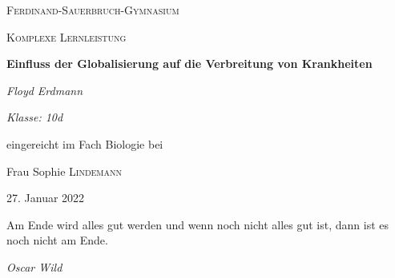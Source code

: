 \documentclass[12pt]{article}
\begin{document}
\setlength{\baselineskip}{5mm}
\onehalfspacing

\begin{titlepage}
	\centering
	{\scshape\LARGE Ferdinand-Sauerbruch-Gymnasium \par}
	\vspace{1cm}
	{\scshape\Large Komplexe Lernleistung\par}
	\vspace{1.5cm}
	{\huge\bfseries Einfluss der Globalisierung auf die Verbreitung von Krankheiten\par}
	\vspace{2cm}
	{\Large\itshape Floyd Erdmann\par}
	{\small\itshape Klasse: 10d\par}%
	\vfill
	eingereicht im Fach Biologie bei\par
	Frau Sophie \textsc{Lindemann}

	\vfill

	{\large27. Januar 2022\par}
\end{titlepage}

\newpage
\tableofcontents
\newpage
\listoffigures
\lstlistoflistings
\newpage
{}
\setcounter{page}{5}
\epigraph{Am Ende wird alles gut werden und wenn noch nicht alles gut ist, dann ist es noch nicht am Ende.}{\textit{Oscar Wild}}
\end{document}
